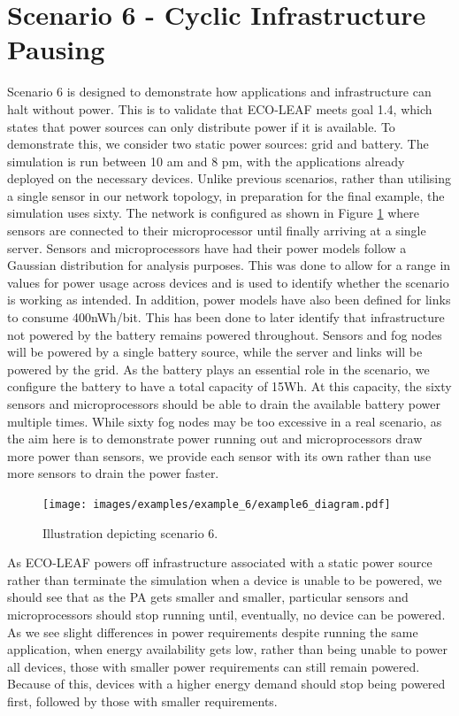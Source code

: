 \documentclass{l4proj}
\begin{document}
\section{Scenario 6 - Cyclic Infrastructure Pausing}\label{eval:subsec:scenario 6}
Scenario 6 is designed to demonstrate how applications and infrastructure can halt without power. This is to validate that ECO-LEAF meets goal 1.4, which states that power sources can only distribute power if it is available.
To demonstrate this, we consider two static power sources: grid and battery.
The simulation is run between 10 am and 8 pm, with the applications already deployed on the necessary devices.
Unlike previous scenarios, rather than utilising a single sensor in our network topology, in preparation for the final example, the simulation uses sixty.
The network is configured as shown in Figure \ref{fig:example6_diagram} where sensors are connected to their microprocessor until finally arriving at a single server.
Sensors and microprocessors have had their power models follow a Gaussian distribution for analysis purposes.
This was done to allow for a range in values for power usage across devices and is used to identify whether the scenario is working as intended.
In addition, power models have also been defined for links to consume 400nWh/bit. This has been done to later identify that infrastructure not powered by the battery remains powered throughout.
Sensors and fog nodes will be powered by a single battery source, while the server and links will be powered by the grid.
As the battery plays an essential role in the scenario, we configure the battery to have a total capacity of 15Wh.
At this capacity, the sixty sensors and microprocessors should be able to drain the available battery power multiple times.
While sixty fog nodes may be too excessive in a real scenario, as the aim here is to demonstrate power running out and microprocessors draw more power than sensors, we provide each sensor with its own rather than use more sensors to drain the power faster.

\begin{figure}[h]
    \centering
    \texttt{[image: images/examples/example\_6/example6\_diagram.pdf]}
    ~
    \caption{Illustration depicting scenario 6.}
    \label{fig:example6_diagram}
\end{figure}

As ECO-LEAF powers off infrastructure associated with a static power source rather than terminate the simulation when a device is unable to be powered, we should see that as the PA gets smaller and smaller, particular sensors and microprocessors should stop running until, eventually, no device can be powered.
As we see slight differences in power requirements despite running the same application, when energy availability gets low, rather than being unable to power all devices, those with smaller power requirements can still remain powered.
Because of this, devices with a higher energy demand should stop being powered first, followed by those with smaller requirements.
\end{document}

